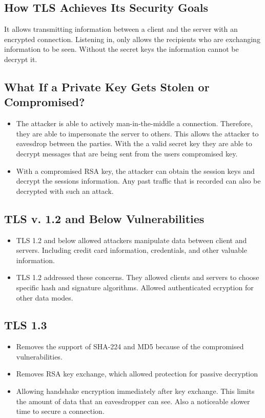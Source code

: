 \documentclass[11pt]{article} %
\begin{document}
\newpage
\subsection{How TLS Achieves Its Security Goals}
It allows transmitting information between a client and the server with an encrypted connection. Listening in, only allows the recipients who are exchanging information to be seen. Without the secret keys the information cannot be decrypt it.
\subsection{What If a Private Key Gets Stolen or Compromised?}
\begin{itemize}
  \item The attacker is able to actively man-in-the-middle a connection. Therefore, they are able to impersonate the server to others. This allows the attacker to eavesdrop between the parties. With the a valid secret key they are able to decrypt messages that are being sent from the users compromised key.
  \item With a compromised RSA key, the attacker can obtain the session keys and decrypt the sessions information. Any past traffic that is recorded can also be decrypted with such an attack.
\end{itemize}
\subsection{TLS v. 1.2 and Below Vulnerabilities}
\begin{itemize}
  \item TLS 1.2 and below allowed attackers manipulate data between client and servers. Including credit card information, credentials, and other valuable information. 
  \item TLS 1.2 addressed these concerns. They allowed clients and servers to choose specific hash and signature algorithms. Allowed authenticated ecryption for other data modes.
  \end{itemize}

\subsection{TLS 1.3}
\begin{itemize}
  \item Removes the support of SHA-224 and MD5 because of the compromised vulnerabilities. 
  \item Removes RSA key exchange, which allowed protection for passive decryption
  \item Allowing handshake encryption immediately after key exchange. This limits the amount of data that an eavesdropper can see. Also a noticeable slower time to secure a connection.
\end{itemize}
\end{document}
